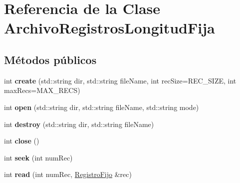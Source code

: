 \hypertarget{class_archivo_registros_longitud_fija}{\section{\-Referencia de la \-Clase \-Archivo\-Registros\-Longitud\-Fija}
\label{class_archivo_registros_longitud_fija}
}
\subsection*{\-Métodos públicos}
\begin{DoxyCompactItemize}
\item 
\hypertarget{class_archivo_registros_longitud_fija_ae945c4c2b1d037ce5f5b7248a5a84cea}{int {\bfseries create} (std\-::string dir, std\-::string file\-Name, int rec\-Size=\-R\-E\-C\-\_\-\-S\-I\-Z\-E, int max\-Recs=\-M\-A\-X\-\_\-\-R\-E\-C\-S)}\label{class_archivo_registros_longitud_fija_ae945c4c2b1d037ce5f5b7248a5a84cea}

\item 
\hypertarget{class_archivo_registros_longitud_fija_ad293810c11d9e8192072203405e4c2c6}{int {\bfseries open} (std\-::string dir, std\-::string file\-Name, std\-::string mode)}\label{class_archivo_registros_longitud_fija_ad293810c11d9e8192072203405e4c2c6}

\item 
\hypertarget{class_archivo_registros_longitud_fija_ae1a7fa527f8817cc50cd1a6e31663df8}{int {\bfseries destroy} (std\-::string dir, std\-::string file\-Name)}\label{class_archivo_registros_longitud_fija_ae1a7fa527f8817cc50cd1a6e31663df8}

\item 
\hypertarget{class_archivo_registros_longitud_fija_a14d663a347c5eafbc8e91735b370caa2}{int {\bfseries close} ()}\label{class_archivo_registros_longitud_fija_a14d663a347c5eafbc8e91735b370caa2}

\item 
\hypertarget{class_archivo_registros_longitud_fija_a2a7f225fc693593dd854660057163872}{int {\bfseries seek} (int num\-Rec)}\label{class_archivo_registros_longitud_fija_a2a7f225fc693593dd854660057163872}

\item 
\hypertarget{class_archivo_registros_longitud_fija_a0296fe1151d55fb835003470abbb6c12}{int {\bfseries read} (int num\-Rec, \hyperlink{class_registro_fijo}{\-Registro\-Fijo} \&rec)}\label{class_archivo_registros_longitud_fija_a0296fe1151d55fb835003470abbb6c12}


\end{DoxyCompactItemize}
